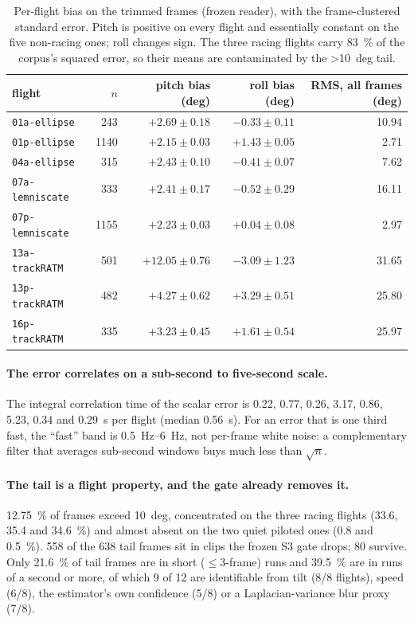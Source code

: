 \begin{table}[t]
\centering
\caption{Per-flight bias on the trimmed frames (frozen reader), with the frame-clustered standard
error. Pitch is positive on every flight and essentially constant on the five non-racing ones; roll
changes sign. The three racing flights carry \SI{83}{\percent} of the corpus's squared error, so
their means are contaminated by the >\SI{10}{deg} tail.}
\label{tab:j-bias}
\begin{tabular}{lrrrr}
\toprule
flight & $n$ & pitch bias (\si{deg}) & roll bias (\si{deg}) & RMS, all frames (\si{deg}) \\
\midrule
\texttt{01a-ellipse} & 243 & $+2.69\pm0.18$ & $-0.33\pm0.11$ & \num{10.94} \\
\texttt{01p-ellipse} & 1140 & $+2.15\pm0.03$ & $+1.43\pm0.05$ & \num{2.71} \\
\texttt{04a-ellipse} & 315 & $+2.43\pm0.10$ & $-0.41\pm0.07$ & \num{7.62} \\
\texttt{07a-lemniscate} & 333 & $+2.41\pm0.17$ & $-0.52\pm0.29$ & \num{16.11} \\
\texttt{07p-lemniscate} & 1155 & $+2.23\pm0.03$ & $+0.04\pm0.08$ & \num{2.97} \\
\texttt{13a-trackRATM} & 501 & $+12.05\pm0.76$ & $-3.09\pm1.23$ & \num{31.65} \\
\texttt{13p-trackRATM} & 482 & $+4.27\pm0.62$ & $+3.29\pm0.51$ & \num{25.80} \\
\texttt{16p-trackRATM} & 335 & $+3.23\pm0.45$ & $+1.61\pm0.54$ & \num{25.97} \\
\bottomrule
\end{tabular}
\end{table}

\paragraph{The error correlates on a sub-second to five-second scale.} The integral correlation
time of the scalar error is \SI{0.22}{}, \SI{0.77}{}, \SI{0.26}{}, \SI{3.17}{}, \SI{0.86}{},
\SI{5.23}{}, \SI{0.34}{} and \SI{0.29}{s} per flight (median \SI{0.56}{s}). For an error that is
one third fast, the ``fast'' band is \SIrange{0.5}{6}{Hz}, not per-frame white noise: a
complementary filter that averages sub-second windows buys much less than $\sqrt{n}$.

\paragraph{The tail is a flight property, and the gate already removes it.} \SI{12.75}{\percent}
of frames exceed \SI{10}{deg}, concentrated on the three racing flights (\SI{33.6}{},
\SI{35.4}{} and \SI{34.6}{\percent}) and almost absent on the two quiet piloted ones
(\SI{0.8}{} and \SI{0.5}{\percent}). \num{558} of the \num{638} tail frames sit in clips the
frozen S3 gate drops; \num{80} survive. Only \SI{21.6}{\percent} of tail frames are in short
($\le3$-frame) runs and \SI{39.5}{\percent} are in runs of a second or more, of which 9 of 12 are
identifiable from tilt (8/8 flights), speed (6/8), the estimator's own confidence (5/8) or a
Laplacian-variance blur proxy (7/8).

